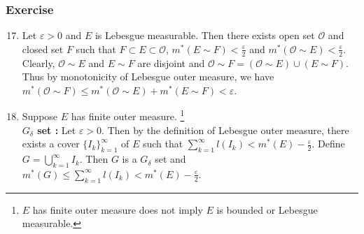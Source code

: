 \subsubsection{Exercise}

\begin{enumerate}
	\setcounter{enumi}{16}
\item Let $\varepsilon > 0$ and $E$ is Lebesgue measurable.
	Then there exists open set $\mathcal{O}$ and closed set $F$ such that $F \subset E \subset \mathcal{O}$, $m^\ast(E \sim F) < \frac{\varepsilon}{2}$ and $m^\ast(\mathcal{O} \sim E) < \frac{\varepsilon}{2}$.
	Clearly, $\mathcal{O} \sim E$ and $E \sim F$ are disjoint and $\mathcal{O} \sim F = (\mathcal{O} \sim E) \cup (E \sim F)$.
		Thus by monotonicity of Lebesgue outer measure, we have $m^\ast(\mathcal{O} \sim F) \le m^\ast(\mathcal{O} \sim E) + m^\ast(E \sim F) < \varepsilon$.
\item
 Suppose $E$ has finite outer measure.
	\dag\footnote{
		$E$ has finite outer measure does not imply $E$ is bounded or Lebesgue measurable.}\\
	\textbf{$G_\delta$ set : }
	Let $\varepsilon > 0$.
	Then by the definition of Lebesgue outer measure, there exists a cover $\{ I_k \}_{k=1}^\infty$ of $E$ such that $\displaystyle \sum_{k=1}^\infty l(I_k) < m^\ast(E) - \frac{\varepsilon}{2}$.
	Define $\displaystyle G = \bigcup_{k=1}^\infty I_k$.
	Then $G$ is a $G_\delta$ set and $\displaystyle m^\ast(G) \le \sum_{k=1}^\infty l(I_k) < m^\ast(E) - \frac{\varepsilon}{2}$.\\


\end{enumerate}
